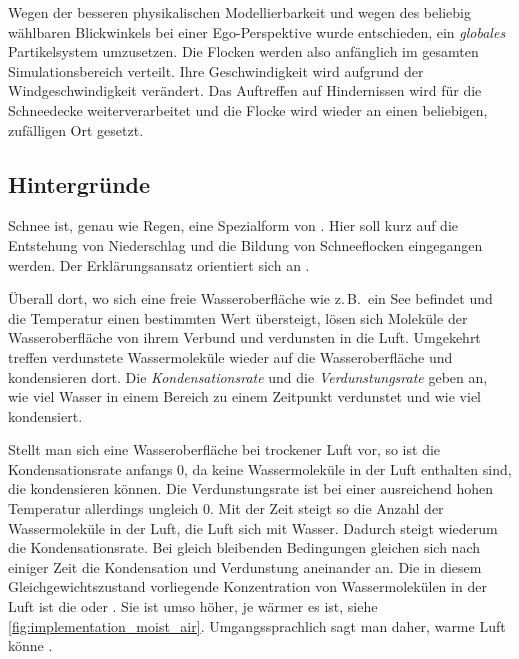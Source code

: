 Wegen der besseren physikalischen Modellierbarkeit und wegen des
beliebig wählbaren Blickwinkels bei einer Ego-Perspektive wurde
entschieden, ein \emph{globales} Partikelsystem umzusetzen. Die
Flocken werden also anfänglich im gesamten Simulationsbereich
verteilt. Ihre Geschwindigkeit wird aufgrund der Windgeschwindigkeit
verändert. Das Auftreffen auf Hindernissen wird für die Schneedecke
weiterverarbeitet und die Flocke wird wieder an einen beliebigen,
zufälligen Ort gesetzt.

\subsection{Hintergründe}

Schnee ist, genau wie Regen, eine Spezialform von .
Hier soll kurz auf die Entstehung von Niederschlag und die Bildung von
Schneeflocken eingegangen werden. Der Erklärungsansatz orientiert sich
an \cite{wiki:Luftfeuchtigkeit}.

Überall dort, wo sich eine freie Wasseroberfläche wie z.\,B.\ ein See befindet und
die Temperatur einen bestimmten Wert übersteigt, lösen sich Moleküle der
Wasseroberfläche von ihrem Verbund und verdunsten in die Luft. Umgekehrt treffen
verdunstete Wassermoleküle wieder auf die Wasseroberfläche und kondensieren
dort. Die \emph{Kondensationsrate} und die
\emph{Verdunstungsrate} geben an, wie viel Wasser in einem Bereich zu
einem Zeitpunkt verdunstet und wie viel kondensiert.

Stellt man sich eine Wasseroberfläche bei trockener Luft vor, so ist
die Kondensationsrate anfangs 0, da keine Wassermoleküle in der Luft
enthalten sind, die kondensieren können. Die Verdunstungsrate ist
bei einer ausreichend hohen Temperatur allerdings ungleich 0. Mit der
Zeit steigt so die Anzahl der Wassermoleküle in der Luft, die Luft
 sich mit Wasser. Dadurch steigt wiederum die
Kondensationsrate. Bei gleich bleibenden Bedingungen gleichen sich
nach einiger Zeit die Kondensation und Verdunstung aneinander an.  Die
in diesem Gleichgewichtszustand vorliegende Konzentration von
Wassermolekülen in der Luft ist die
 oder . Sie ist umso höher, je wärmer es ist, siehe
\autoref{fig:implementation_moist_air}. Umgangssprachlich sagt man
daher, warme Luft könne .

